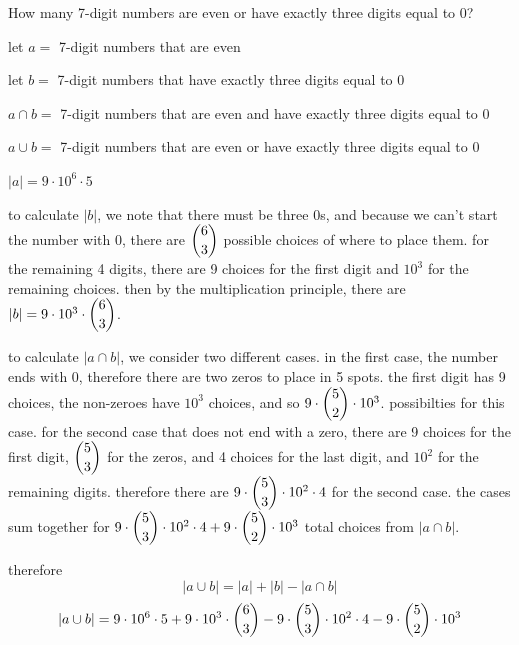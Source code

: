 \documentclass[openany, 12pt]{book}
\begin{document}
\begin{exercise}{}{}
	How many 7-digit numbers are even or have exactly three digits equal to 0?
	\begin{alist}
		\item let $a=$ 7-digit numbers that are even
		\item let $b=$ 7-digit numbers that have exactly three digits equal to 0
		\item $a\cap b=$ 7-digit numbers that are even and have exactly three digits equal to 0
		\item $a\cup b=$ 7-digit numbers that are even or have exactly three digits equal to 0
		\item $|a|=9\cdot10^6\cdot5$
		\item to calculate $|b|$, we note that there must be three 0s, and because we
		can't start the number with 0, there are $\dbinom{6}{3}$ possible choices of
		where to place them. for the remaining 4 digits, there are
		9 choices for the first digit and $10^3$ for the remaining choices. then by the multiplication principle, there are
		$|b|=9\cdot10^3\cdot \dbinom{6}{3}$.
		\item to calculate $|a\cap b|$, we consider two different cases. in the first
		case, the number ends with 0, therefore there are two zeros to place in 5
		spots. the first digit has 9 choices, the non-zeroes have $10^3$ choices,
		and so $9\cdot\dbinom{5}{2}\cdot10^3$. possibilties for this case. for the
		second case that does not end with a zero, there are 9 choices for the
		first digit, $\dbinom{5}{3}$ for the zeros, and 4 choices for the last
		digit, and $10^2$ for the remaining digits. therefore there are
		$9\cdot\dbinom{5}{3}\cdot10^2\cdot4$ for the second case. the cases sum together for
		$9\cdot\dbinom{5}{3}\cdot10^2\cdot4 +
			9\cdot\dbinom{5}{2}\cdot10^3$ total choices from $|a\cap b|$.
		\item therefore
		$$|a \cup b | = |a| + |b| - |a \cap b|$$
		$$|a \cup b | =
			9\cdot10^6\cdot5 + 9\cdot10^3\cdot \dbinom{6}{3} - 9\cdot\dbinom{5}{3}\cdot10^2\cdot4 - 9\cdot\dbinom{5}{2}\cdot10^3$$
	\end{alist}
\end{exercise}
\end{document}
